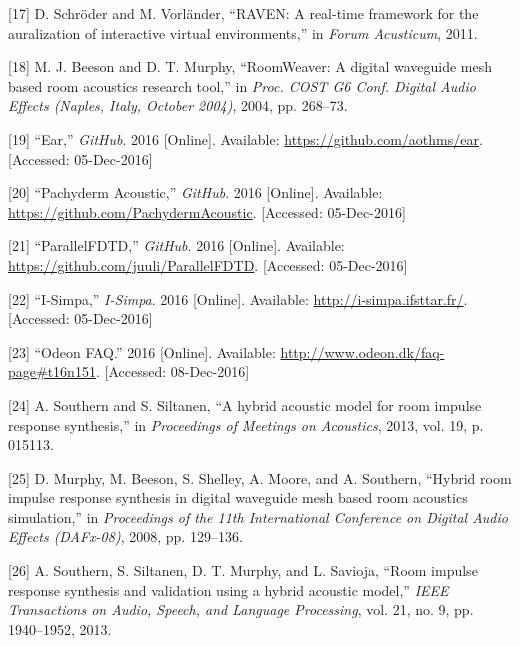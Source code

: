 \documentclass[]{scrreprt}
\begin{document}
\hypertarget{ref-schroderux5fraven:ux5f2011}{}
{[}17{]} D. Schröder and M. Vorländer, ``RAVEN: A real-time framework
for the auralization of interactive virtual environments,'' in
\emph{Forum Acusticum}, 2011.

\hypertarget{ref-beesonux5froomweaver:ux5f2004}{}
{[}18{]} M. J. Beeson and D. T. Murphy, ``RoomWeaver: A digital
waveguide mesh based room acoustics research tool,'' in \emph{Proc. COST
G6 Conf. Digital Audio Effects (Naples, Italy, October 2004)}, 2004, pp.
268--73.

\hypertarget{ref-ux5fearux5f2016}{}
{[}19{]} ``Ear,'' \emph{GitHub}. 2016 {[}Online{]}. Available:
\url{https://github.com/aothms/ear}. {[}Accessed: 05-Dec-2016{]}

\hypertarget{ref-ux5fpachydermux5f2016}{}
{[}20{]} ``Pachyderm Acoustic,'' \emph{GitHub}. 2016 {[}Online{]}.
Available: \url{https://github.com/PachydermAcoustic}. {[}Accessed:
05-Dec-2016{]}

\hypertarget{ref-ux5fparallelfdtdux5f2016}{}
{[}21{]} ``ParallelFDTD,'' \emph{GitHub}. 2016 {[}Online{]}. Available:
\url{https://github.com/juuli/ParallelFDTD}. {[}Accessed: 05-Dec-2016{]}

\hypertarget{ref-ux5fi-simpaux5f2016}{}
{[}22{]} ``I-Simpa,'' \emph{I-Simpa}. 2016 {[}Online{]}. Available:
\url{http://i-simpa.ifsttar.fr/}. {[}Accessed: 05-Dec-2016{]}

\hypertarget{ref-ux5fodeonux5f2016-1}{}
{[}23{]} ``Odeon FAQ.'' 2016 {[}Online{]}. Available:
\url{http://www.odeon.dk/faq-page\#t16n151}. {[}Accessed: 08-Dec-2016{]}

\hypertarget{ref-southernux5fhybridux5f2013}{}
{[}24{]} A. Southern and S. Siltanen, ``A hybrid acoustic model for room
impulse response synthesis,'' in \emph{Proceedings of Meetings on
Acoustics}, 2013, vol. 19, p. 015113.

\hypertarget{ref-murphyux5fhybridux5f2008}{}
{[}25{]} D. Murphy, M. Beeson, S. Shelley, A. Moore, and A. Southern,
``Hybrid room impulse response synthesis in digital waveguide mesh based
room acoustics simulation,'' in \emph{Proceedings of the 11th
International Conference on Digital Audio Effects (DAFx-08)}, 2008, pp.
129--136.

\hypertarget{ref-southernux5froomux5f2013}{}
{[}26{]} A. Southern, S. Siltanen, D. T. Murphy, and L. Savioja, ``Room
impulse response synthesis and validation using a hybrid acoustic
model,'' \emph{IEEE Transactions on Audio, Speech, and Language
Processing}, vol. 21, no. 9, pp. 1940--1952, 2013.
\end{document}
